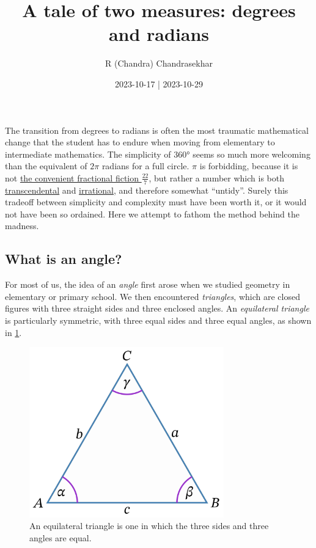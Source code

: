 \documentclass[
  a4paper,
]{article}
\title{A tale of two measures: degrees and radians}
\author{R (Chandra) Chandrasekhar}
\date{2023-10-17 | 2023-10-29}
\begin{document}
\maketitle

\thispagestyle{empty}


The transition from degrees to radians is often the most traumatic
mathematical change that the student has to endure when moving from
elementary to intermediate mathematics. The simplicity of 360° seems so
much more welcoming than the equivalent of \(2\pi\) radians for a full
circle. \(\pi\) is forbidding, because it is not
\href{https://en.wikipedia.org/wiki/Proof_that_22/7_exceeds_\%CF\%80}{the
convenient fractional fiction \(\frac{22}{7}\)}, but rather a number
which is both
\href{https://mathworld.wolfram.com/TranscendentalNumber.html}{transcendental}
and \href{https://en.wikipedia.org/wiki/Irrational_number}{irrational},
and therefore somewhat ``untidy''. Surely this tradeoff between
simplicity and complexity must have been worth it, or it would not have
been so ordained. Here we attempt to fathom the method behind the
madness.

\hypertarget{what-is-an-angle}{%
\subsection{What is an angle?}\label{what-is-an-angle}}

For most of us, the idea of an \emph{angle} first arose when we studied
geometry in elementary or primary school. We then encountered
\emph{triangles}, which are closed figures with three straight sides and
three enclosed angles. An \emph{equilateral triangle} is particularly
symmetric, with three equal sides and three equal angles, as shown in
\cref{fig:equilateral}.

\begin{figure}
\hypertarget{fig:equilateral}{%
\centering
\includegraphics[width=0.75\textwidth,height=\textheight]{images/equilateral.png}
\caption{An equilateral triangle is one in which the three sides and
three angles are equal.}\label{fig:equilateral}
}
\end{figure}
\end{document}
